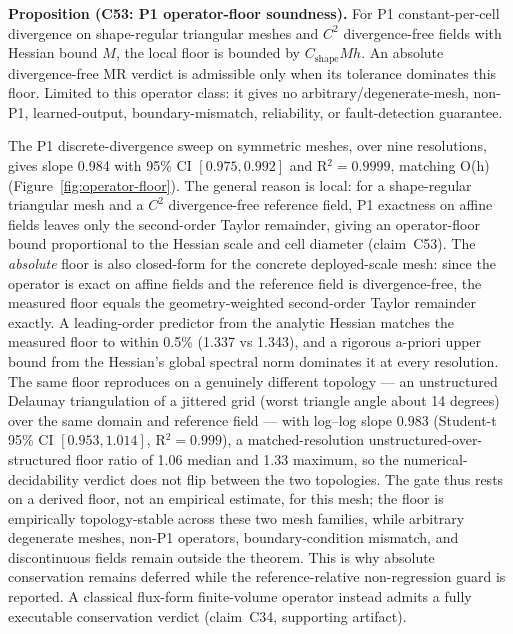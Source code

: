 \documentclass[preprint,12pt,authoryear]{elsarticle}
\begin{document}
\noindent\begin{minipage}{\linewidth}
\textbf{Proposition (C53: P1 operator-floor soundness).}
For P1 constant-per-cell divergence on shape-regular triangular meshes and
$C^2$ divergence-free fields with Hessian bound $M$, the local floor is bounded
by $C_{\mathrm{shape}}Mh$. An absolute divergence-free MR verdict is admissible
only when its tolerance dominates this floor. Limited to this operator class:
it gives no arbitrary/degenerate-mesh, non-P1, learned-output,
boundary-mismatch, reliability, or fault-detection guarantee.
\end{minipage}
\medskip

The P1 discrete-divergence sweep on symmetric meshes, over nine resolutions, gives slope 0.984 with 95\% CI $[0.975, 0.992]$ and R$^2=0.9999$, matching O(h) (Figure~\ref{fig:operator-floor}). The general reason is local: for a shape-regular triangular mesh and a $C^2$ divergence-free reference field, P1 exactness on affine fields leaves only the second-order Taylor remainder, giving an operator-floor bound proportional to the Hessian scale and cell diameter (claim~C53). The \emph{absolute} floor is also closed-form for the concrete deployed-scale mesh: since the operator is exact on affine fields and the reference field is divergence-free, the measured floor equals the geometry-weighted second-order Taylor remainder exactly. A leading-order predictor from the analytic Hessian matches the measured floor to within 0.5\% (1.337 vs 1.343), and a rigorous a-priori upper bound from the Hessian's global spectral norm dominates it at every resolution. The same floor reproduces on a genuinely different topology --- an unstructured Delaunay triangulation of a jittered grid (worst triangle angle about 14 degrees) over the same domain and reference field --- with log--log slope 0.983 (Student-t 95\% CI $[0.953, 1.014]$, R$^2=0.999$), a matched-resolution unstructured-over-structured floor ratio of 1.06 median and 1.33 maximum, so the numerical-decidability verdict does not flip between the two topologies. The gate thus rests on a derived floor, not an empirical estimate, for this mesh; the floor is empirically topology-stable across these two mesh families, while arbitrary degenerate meshes, non-P1 operators, boundary-condition mismatch, and discontinuous fields remain outside the theorem. This is why absolute conservation remains deferred while the reference-relative non-regression guard is reported. A classical flux-form finite-volume operator instead admits a fully executable conservation verdict (claim~C34, supporting artifact).
\end{document}
